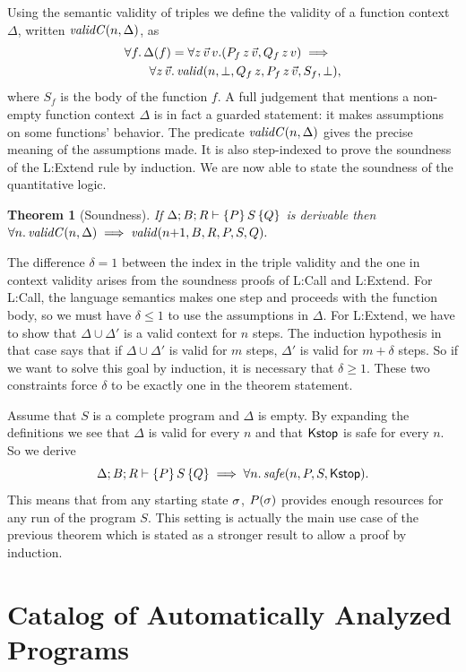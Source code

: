 \documentclass[nocopyrightspace,preprint,pldi]{sigplanconf-pldi15}
\newtheorem{theorem}{Theorem}
\begin{document}
{Using the semantic validity of triples we define the validity
of a function context $\Delta$, written $\mathit{validC}(n,\Delta)$, as
\begin{align*}
  &\forall f .\, \Delta(f) =
    \forall z \, \vec v \, v .(P_f \, z \, \vec v, Q_f \, z \, v)
    \implies \\
  &\qquad \forall z \, \vec v .\,
  \mathit{valid}(n,\bot,Q_f \, z,P_f \, z \, \vec v,S_f,\bot) ,
\end{align*}
where $S_f$ is the body of the function $f$. A full
judgement that mentions a non-empty function context
$\Delta$ is in fact a guarded statement: it makes
assumptions on some functions' behavior.  The predicate
$\mathit{validC}(n,\Delta)$ gives the precise meaning of the
assumptions made.  It is also step-indexed to prove the
soundness of the {\sc L:Extend} rule by induction.
%
We are now able to state the soundness of the quantitative logic.
%
\begin{theorem}[Soundness]
  If $\Delta; B; R \vdash \{P\}\, S\, \{Q\}$ is derivable then
  $
    \forall n .\, \mathit{validC}(n,\Delta)
      \implies \mathit{valid}(n {+} 1,B,R,P,S,Q).
  $
\end{theorem}
%
\noindent
The difference $\delta = 1$ between the index in the triple
validity and the one in context validity arises from
the soundness proofs of {\sc L:Call} and {\sc L:Extend}.  For
{\sc L:Call}, the language semantics makes one step and
proceeds with the function body, so we must have
$\delta \le 1$ to use the assumptions in $\Delta$.
For {\sc L:Extend}, we have to show that $\Delta \cup \Delta'$
is a valid context for $n$ steps.  The induction hypothesis
in that case says that if $\Delta \cup \Delta'$ is valid
for $m$ steps, $\Delta'$ is valid for $m+\delta$ steps.
So if we want to solve this goal by induction, it is
necessary that $\delta \ge 1$.  These two constraints force
$\delta$ to be exactly one in the theorem statement.

Assume that $S$ is a complete program and $\Delta$ is empty.  By
expanding the definitions we see that $\Delta$ is valid
for every $n$ and that $\mathsf{Kstop}$ is safe for every $n$. So
we derive
$$
\Delta; B; R \vdash \{P\}\, S\, \{Q\} \implies   \forall n .\, \mathit{safe}(n,P,S,\mathsf{Kstop}).
$$
This means that from any starting state $\sigma$, $P(\sigma)$
provides enough resources for any run of the program $S$.  This
setting is actually the main use case of the previous theorem
which is stated as a stronger result to allow a proof by
induction.




\section{Catalog of Automatically Analyzed Programs}
\label{app:cat}

}
\end{document}
